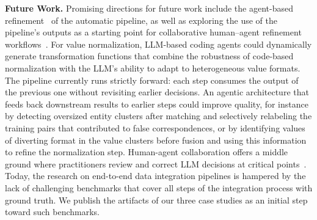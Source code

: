 \textbf{Future Work.} 
Promising directions for future work include the agent-based refinement~\cite{zhu2025surveydataagents} of the automatic pipeline, as well as exploring the use of the pipeline’s outputs as a starting point for collaborative human–agent refinement workflows~\cite{santos2025interactiveHarmonization}. For value normalization, LLM-based coding agents could dynamically generate transformation functions that combine the robustness of code-based normalization with the LLM's ability to adapt to heterogeneous value formats. The pipeline currently runs strictly forward: each step consumes the output of the previous one without revisiting earlier decisions. An agentic architecture that feeds back downstream results to earlier steps could improve quality, for instance by detecting oversized entity clusters after matching and selectively relabeling the training pairs that contributed to false correspondences, or by identifying values of diverting format in the value clusters before fusion and using this information to refine the normalization step. Human-agent collaboration offers a middle ground where practitioners review and correct LLM decisions at critical points~\cite{santos2025interactiveHarmonization, Barbosa2026}. Today, the research on end-to-end data integration pipelines is hampered by the lack of challenging benchmarks that cover all steps of the integration process with ground truth. We publish the artifacts of our three case studies as an initial step toward such benchmarks.